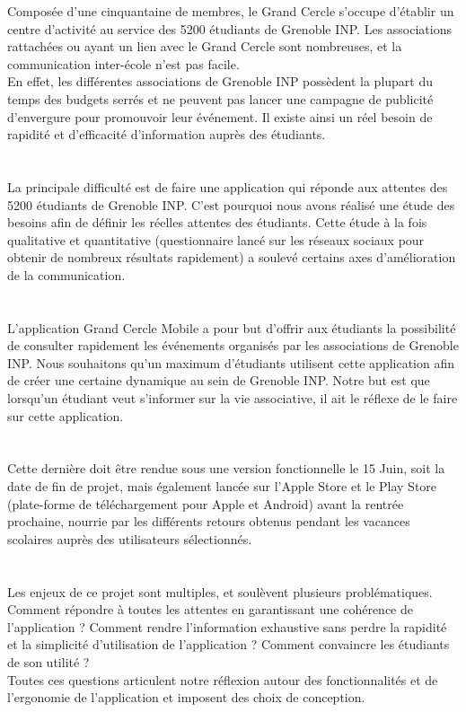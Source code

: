 \documentclass[a4paper,11px]{article}
\begin{document}
\vspace*{\fill}
\indent Composée d'une cinquantaine de membres, le Grand Cercle s'occupe d'établir un centre d’activité au service des 5200 étudiants de Grenoble INP. Les associations rattachées ou ayant un lien avec le Grand Cercle sont nombreuses, et la communication inter-école n'est pas facile.\\
En effet, les différentes associations de Grenoble INP possèdent la plupart du temps des budgets serrés et ne peuvent pas lancer une campagne de publicité d'envergure pour promouvoir leur événement. Il existe ainsi un réel besoin de rapidité et d'efficacité d'information auprès des étudiants.\\
\\
\\
\indent La principale difficulté est de faire une application qui réponde aux attentes des 5200 étudiants de Grenoble INP. C'est pourquoi nous avons réalisé une étude des besoins afin de définir les réelles attentes des étudiants. Cette étude à la fois qualitative et quantitative (questionnaire lancé sur les réseaux sociaux pour obtenir de nombreux résultats rapidement) a soulevé certains axes d'amélioration de la communication.\\
\\
\\
\indent L'application Grand Cercle Mobile a pour but d'offrir aux étudiants la possibilité de consulter rapidement les événements organisés par les associations de Grenoble INP. Nous souhaitons qu'un maximum d'étudiants utilisent cette application afin de créer une certaine dynamique au sein de Grenoble INP. Notre but est que lorsqu'un étudiant veut s'informer sur la vie associative, il ait le réflexe de le faire sur cette application.\\
\\
\\
\indent Cette dernière doit être rendue sous une version fonctionnelle le 15 Juin, soit la date de fin de projet, mais également lancée sur l'Apple Store et le Play Store (plate-forme de téléchargement pour Apple et Android) avant la rentrée prochaine, nourrie par les différents retours obtenus pendant les vacances scolaires auprès des utilisateurs sélectionnés.\\
\\
\\
\indent Les enjeux de ce projet sont multiples, et soulèvent plusieurs problématiques. Comment répondre à toutes les attentes en garantissant une cohérence de l'application ? Comment rendre l'information exhaustive sans perdre la rapidité et la simplicité d'utilisation de l'application ? Comment convaincre les étudiants de son utilité ?\\
Toutes ces questions articulent notre réflexion autour des fonctionnalités et de l'ergonomie de l'application et imposent des choix de conception.\\
\vspace*{\fill}
\newpage
\end{document}
